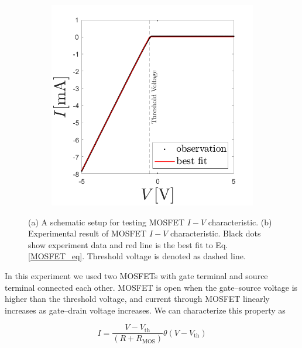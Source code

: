 \documentclass[%
 aip,
amsmath,amssymb,
reprint,
]{revtex4-1}
\begin{document}
\begin{figure}[!htbp]
  \begin{subfigure}{0.23\textwidth}
    \includegraphics[width=\linewidth]{figures/MOSFETIV.png}
    \caption{}
    \label{MOSFET_circuitfig_b}
  \end{subfigure}

\caption{(a) A schematic setup for testing MOSFET $I-V$ characteristic. (b) Experimental result of MOSFET $I-V$ characteristic. Black dots show experiment data and red line is the best fit to Eq. \ref{MOSFET_eq}. Threshold voltage is denoted as dashed line.} \label{MOSFET_circuitfig}
\end{figure}

In this experiment we used two MOSFETs with gate terminal and source terminal connected each other.
MOSFET is open when the gate--source voltage is higher than the threshold voltage, and current through MOSFET linearly increases as gate--drain voltage increases.
We can characterize this property as 

\begin{equation}
I=\frac{V-V_{\textrm{th}}}{(R+R_{\textrm{MOS}})}\theta(V-V_{\textrm{th}})
\label{MOSFET_eq}
\end{equation}
\end{document}
